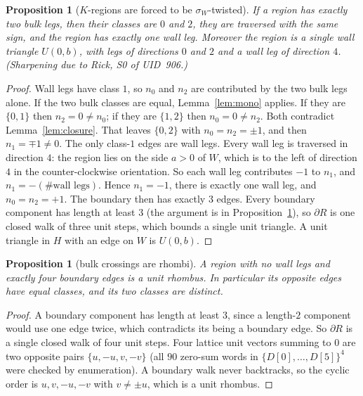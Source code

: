 \documentclass[11pt]{article}
\newtheorem{proposition}[theorem]{Proposition}
\theoremstyle{definition}
\begin{document}
\begin{proposition}[$K$-regions are forced to be $\sigma_W$-twisted]\label{prop:K}
If a region has exactly two bulk legs, then their classes are $0$ and $2$, they are traversed
with the same sign, and the region has exactly one wall leg. Moreover the region is a single wall
triangle $U(0,b)$, with legs of directions $0$ and $2$ and a wall leg of direction $4$.
(Sharpening due to Rick, S0 of UID~906.)
\end{proposition}
\begin{proof}
Wall legs have class $1$, so $n_0$ and $n_2$ are contributed by the two bulk legs alone. If the two
bulk classes are equal, Lemma~\ref{lem:mono} applies. If they are $\{0,1\}$ then $n_2=0\neq n_0$;
if they are $\{1,2\}$ then $n_0=0\ne n_2$. Both contradict Lemma~\ref{lem:closure}. That leaves
$\{0,2\}$ with $n_0=n_2=\pm1$, and then $n_1=\mp1\ne0$. The only class-$1$ edges are wall legs.
Every wall leg is traversed in direction $4$: the region lies on the side $a>0$ of $W$, which is
to the left of direction $4$ in the counter-clockwise orientation. So each wall leg contributes
$-1$ to $n_1$, and $n_1=-(\#\text{wall legs})$. Hence $n_1=-1$, there is exactly one wall leg, and
$n_0=n_2=+1$. The boundary then has exactly $3$ edges. Every boundary component has length at least
$3$ (the argument is in Proposition~\ref{prop:R}), so $\partial R$ is one closed walk of three unit
steps, which bounds a single unit triangle. A unit triangle in $H$ with an edge on $W$ is $U(0,b)$.
\end{proof}

\begin{proposition}[bulk crossings are rhombi]\label{prop:R}
A region with no wall legs and exactly four boundary edges is a unit rhombus. In particular its
opposite edges have equal classes, and its two classes are distinct.
\end{proposition}
\begin{proof}
A boundary component has length at least $3$, since a length-$2$ component would use one edge twice,
which contradicts its being a boundary edge. So $\partial R$ is a single closed walk of four unit
steps. Four lattice unit vectors summing to $0$ are two opposite pairs $\{u,-u,v,-v\}$ (all $90$
zero-sum words in $\{D[0],\dots,D[5]\}^4$ were checked by enumeration). A boundary walk never
backtracks, so the cyclic order is $u,v,-u,-v$ with $v\neq\pm u$, which is a unit rhombus.
\end{proof}
\end{document}
